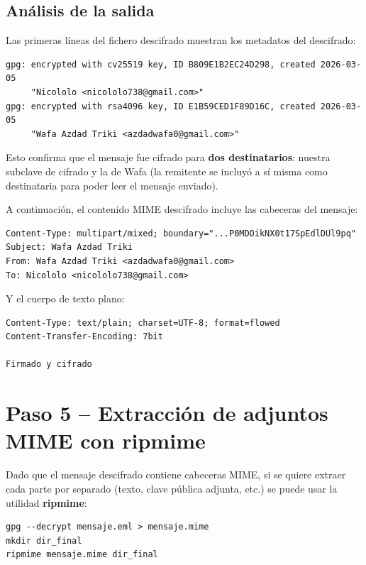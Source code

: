 \subsection{Análisis de la salida}

Las primeras líneas del fichero descifrado muestran los metadatos del descifrado:

\begin{lstlisting}[caption=Cabeceras de diagnóstico de gpg en la salida descifrada]
gpg: encrypted with cv25519 key, ID B809E1B2EC24D298, created 2026-03-05
     "Nicololo <nicololo738@gmail.com>"
gpg: encrypted with rsa4096 key, ID E1B59CED1F89D16C, created 2026-03-05
     "Wafa Azdad Triki <azdadwafa0@gmail.com>"
\end{lstlisting}

Esto confirma que el mensaje fue cifrado para \textbf{dos destinatarios}: nuestra subclave de cifrado y la de Wafa (la remitente se incluyó a sí misma como destinataria para poder leer el mensaje enviado).

A continuación, el contenido MIME descifrado incluye las cabeceras del mensaje:

\begin{lstlisting}[caption=Cabeceras MIME del mensaje descifrado]
Content-Type: multipart/mixed; boundary="...P0MDOikNX0t17SpEdlDUl9pq"
Subject: Wafa Azdad Triki
From: Wafa Azdad Triki <azdadwafa0@gmail.com>
To: Nicololo <nicololo738@gmail.com>
\end{lstlisting}

Y el cuerpo de texto plano:

\begin{lstlisting}[caption=Cuerpo del mensaje descifrado]
Content-Type: text/plain; charset=UTF-8; format=flowed
Content-Transfer-Encoding: 7bit

Firmado y cifrado
\end{lstlisting}

\section{Paso 5 -- Extracción de adjuntos MIME con ripmime}

Dado que el mensaje descifrado contiene cabeceras MIME, si se quiere extraer cada parte por separado (texto, clave pública adjunta, etc.) se puede usar la utilidad \textbf{ripmime}:

\begin{lstlisting}[caption=Extracción de adjuntos MIME con ripmime]
gpg --decrypt mensaje.eml > mensaje.mime
mkdir dir_final
ripmime mensaje.mime dir_final
\end{lstlisting}

